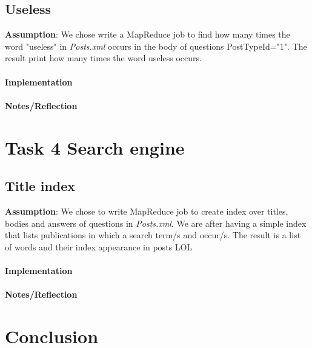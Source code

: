 \documentclass[fleqn,10pt]{wlscirep}
\begin{document}
\subsection{Useless}
\textbf{Assumption}:  We chose write a MapReduce job  to find how many times the word "useless" in \textit{Posts.xml} occurs in the body of questions PostTypeId="1". The result print how many times the word useless occurs.  \\ \\
\textbf{Implementation}  \\ \\
\textbf{Notes/Reflection}

\section{Task 4 Search engine}
\subsection{Title index}
\textbf{Assumption}: We chose to write MapReduce job to create index over titles, bodies and answers of questions in \textit{Posts.xml}. We are after having a simple index that lists publications in which a search term/s and occur/s. The result is a list of words and their index appearance in posts LOL \\ \\
\textbf{Implementation}  \\ \\
\textbf{Notes/Reflection}




\section*{Conclusion}
\end{document}
